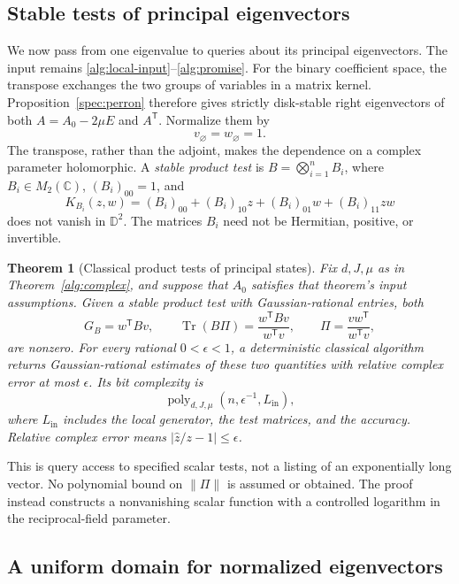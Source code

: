 \documentclass[reqno]{amsart}
\newtheorem{theorem}{Theorem}[section]
\theoremstyle{definition}
\theoremstyle{remark}
\newcommand{\C}{\mathbb C}
\newcommand{\D}{\mathbb D}
\DeclareMathOperator{\Tr}{Tr}
\begin{document}

\subsection{Stable tests of principal eigenvectors}
\label{alg:states-subsection}

We now pass from one eigenvalue to queries about its principal
eigenvectors.  The input remains \eqref{alg:local-input}--\eqref{alg:promise}.
For the binary coefficient space, the transpose exchanges the two
groups of variables in a matrix kernel.  Proposition~\ref{spec:perron}
therefore gives strictly disk-stable right eigenvectors of both
\(A=A_0-2\mu E\) and \(A^{\mathsf T}\).  Normalize them by
\[
 v_\varnothing=w_\varnothing=1.
\]
The transpose, rather than the adjoint, makes the dependence on a
complex parameter holomorphic.  A \emph{stable product test} is
\(B=\bigotimes_{i=1}^n B_i\), where \(B_i\in M_2(\C)\),
\((B_i)_{00}=1\), and
\[
 K_{B_i}(z,w)=
 (B_i)_{00}+(B_i)_{10}z+(B_i)_{01}w+(B_i)_{11}zw
\]
does not vanish in \(\D^2\).  The matrices \(B_i\) need not be
Hermitian, positive, or invertible.

\begin{theorem}[Classical product tests of principal states]
\label{alg:product-test}
Fix \(d,J,\mu\) as in Theorem~\ref{alg:complex}, and suppose that
\(A_0\) satisfies that theorem's input assumptions.  Given a stable
product test with Gaussian-rational entries, both
\[
 G_B=w^{\mathsf T}Bv,\qquad
 \Tr(B\Pi)=\frac{w^{\mathsf T}Bv}{w^{\mathsf T}v},
 \qquad \Pi=\frac{vw^{\mathsf T}}{w^{\mathsf T}v},
\]
are nonzero.  For every rational \(0<\epsilon<1\), a deterministic
classical algorithm returns Gaussian-rational estimates of these
two quantities with relative complex error at most \(\epsilon\).
Its bit complexity is
\[
 \operatorname{poly}_{d,J,\mu}
       (n,\epsilon^{-1},L_{\mathrm{in}}),
\]
where \(L_{\mathrm{in}}\) includes the local generator, the test
matrices, and the accuracy.  Relative complex error means
\(|\widehat z/z-1|\le\epsilon\).
\end{theorem}

This is query access to specified scalar tests, not a listing of an
exponentially long vector.  No polynomial bound on \(\|\Pi\|\) is
assumed or obtained.  The proof instead constructs a nonvanishing
scalar function with a controlled logarithm in the reciprocal-field
parameter.

\subsection{A uniform domain for normalized eigenvectors}
\end{document}
